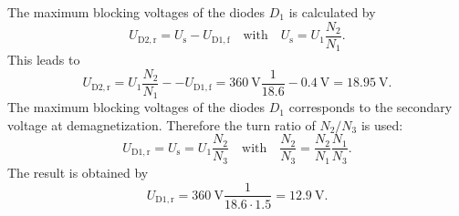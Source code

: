 \begin{solutionblock}
    The maximum blocking voltages of the diodes $D_\mathrm{1}$ is calculated by
    \begin{equation}
        U_\mathrm{D2,r}=U_\mathrm{s}-U_\mathrm{D1,f} \quad \text{with} \quad U_\mathrm{s}=U_\mathrm{1}\frac{N_\mathrm{2}}{N_\mathrm{1}}.
    \end{equation}
    This leads to
    \begin{equation}
        U_\mathrm{D2,r}=U_\mathrm{1}\frac{N_\mathrm{2}}{N_\mathrm{1}}--U_\mathrm{D1,f}=
        \SI{360}{\volt}\frac{1}{18.6}-\SI{0.4}{\volt}=\SI{18.95}{\volt}.
    \end{equation}
    The maximum blocking voltages of the diodes $D_\mathrm{1}$ corresponds to the secondary voltage at demagnetization.
    Therefore the turn ratio of $N_\mathrm{2}/N_\mathrm{3}$ is used:
    \begin{equation}
        U_\mathrm{D1,r}=U_\mathrm{s}=U_\mathrm{1}\frac{N_\mathrm{2}}{N_\mathrm{3}} \quad \text{with} \quad
        \frac{N_\mathrm{2}}{N_\mathrm{3}}=\frac{N_\mathrm{2}}{N_\mathrm{1}}\frac{N_\mathrm{1}}{N_\mathrm{3}}.
    \end{equation}
    The result is obtained by
    \begin{equation}
        U_\mathrm{D1,r}=\SI{360}{\volt}\frac{1}{18.6 \cdot 1.5}=\SI{12.9}{\volt}.
    \end{equation}
\end{solutionblock}

